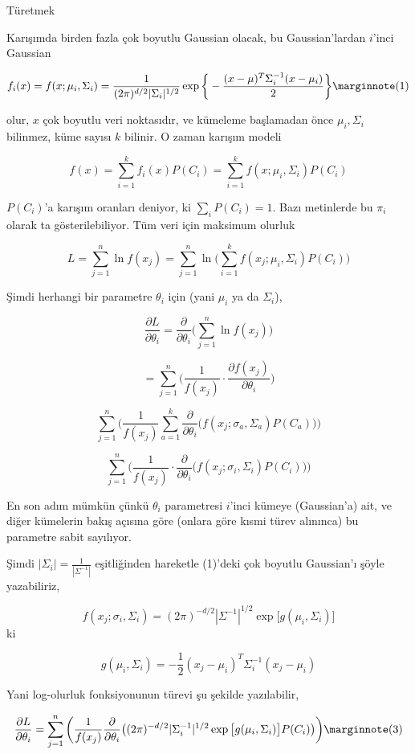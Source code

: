 \documentclass[12pt,fleqn]{article}\usepackage{../../common}
\begin{document}
Türetmek 

Karışımda birden fazla çok boyutlu Gaussian olacak, bu Gaussian'lardan
$i$'inci Gaussian

$$ 
f_i(x) = f(x;\mu_i,\Sigma_i) = 
\frac{1}{(2\pi)^{d/2} |\Sigma_i|^{1/2}} \exp 
\bigg\{
-\frac{(x-\mu)^T\Sigma_i^{-1}(x-\mu_i)}{2} 
\bigg\} 
\mlabel{1}
$$

olur, $x$ çok boyutlu veri noktasıdır, ve kümeleme başlamadan önce
$\mu_i,\Sigma_i$ bilinmez, küme sayısı $k$ bilinir. O zaman karışım modeli

$$ f(x) = \sum_{i=1}^{k} f_i(x)P(C_i) =
\sum_{i=1}^{k} f(x;\mu_i,\Sigma_i)P(C_i)
$$

$P(C_i)$'a karışım oranları deniyor, ki $\sum_i P(C_i) = 1$. Bazı
metinlerde bu $\pi_i$ olarak ta gösterilebiliyor.  Tüm veri için maksimum
olurluk

$$ 
L = \sum_{j=1}^{n} \ln f(x_j) = \sum_{j=1}^{n} \ln \bigg(
\sum_{i=1}^{k} f(x_j;\mu_i,\Sigma_i)P(C_i)
\bigg)
$$

Şimdi herhangi bir parametre $\theta_i$ için (yani $\mu_i$ ya da $\Sigma_i$), 

$$ 
\frac{\partial L}{\partial \theta_i} = 
\frac{\partial }{\partial \theta_i} 
\bigg(\sum_{j=1}^{n} \ln f(x_j) \bigg)
$$

$$ 
= \sum_{j=1}^{n} \big( \frac{1}{f(x_j)} \cdot
\frac{\partial f(x_j)}{\partial \theta_i} \big)
$$

$$ 
\sum_{j=1}^{n} \bigg(
\frac{1}{f(x_j)} \sum_{a=1}^{k} \frac{\partial }{\partial \theta_i}
\big( f(x_j;\sigma_a,\Sigma_a)P(C_a) \big)
\bigg)
$$

$$ 
\sum_{j=1}^{n} \bigg(
\frac{1}{f(x_j)} \cdot \frac{\partial }{\partial \theta_i}
\big( f(x_j;\sigma_i,\Sigma_i)P(C_i) \big)
\bigg)
$$

En son adım mümkün çünkü $\theta_i$ parametresi $i$'inci kümeye
(Gaussian'a) ait, ve diğer kümelerin bakış açısına göre (onlara göre kısmi
türev alınınca) bu parametre sabit sayılıyor. 

Şimdi $|\Sigma_i| = \frac{1}{|\Sigma^{-1}|}$ eşitliğinden hareketle
(1)'deki çok boyutlu Gaussian'ı şöyle yazabiliriz, 

$$ 
f(x_j;\sigma_i,\Sigma_i) = (2\pi)^{-d/2} |\Sigma^{-1}|^{1/2} 
\exp \big[ g(\mu_i,\Sigma_i) \big]
$$ 
ki

$$ g(\mu_i,\Sigma_i) = -\frac{1}{2}(x_j-\mu_i)^T\Sigma_i^{-1}(x_j-\mu_i) $$

Yani log-olurluk fonksiyonunun türevi şu şekilde yazılabilir,

$$ 
\frac{\partial L}{\partial \theta_i} =
\sum_{j=1}^{n} \bigg(
\frac{1}{f(x_j)} \frac{\partial }{\partial \theta_i} \big(
(2\pi)^{-d/2} |\Sigma_i^{-1}|^{1/2} \exp\big[ 
g(\mu_i,\Sigma_i) \big] P(C_i)
\big) \bigg)
\mlabel{3}
$$
\end{document}
